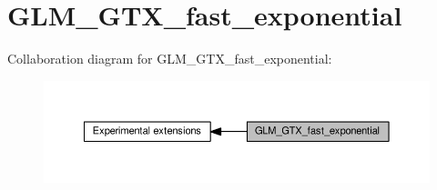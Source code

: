\hypertarget{group__gtx__fast__exponential}{}\section{G\+L\+M\+\_\+\+G\+T\+X\+\_\+fast\+\_\+exponential}
\label{group__gtx__fast__exponential}
Collaboration diagram for G\+L\+M\+\_\+\+G\+T\+X\+\_\+fast\+\_\+exponential\+:
\nopagebreak
\begin{figure}[H]
\begin{center}
\leavevmode
\includegraphics[width=350pt]{da/df6/group__gtx__fast__exponential}
\end{center}
\end{figure}
